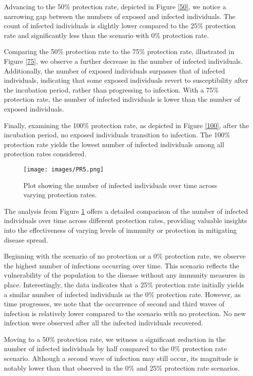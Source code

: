 Advancing to the 50\% protection rate, depicted in Figure \ref{50}, we notice a narrowing gap between the numbers of exposed and infected individuals. The count of infected individuals is slightly lower compared to the 25\% protection rate and significantly less than the scenario with 0\% protection rate.

Comparing the 50\% protection rate to the 75\% protection rate, illustrated in Figure \ref{75}, we observe a further decrease in the number of infected individuals. Additionally, the number of exposed individuals surpasses that of infected individuals, indicating that some exposed individuals revert to susceptibility after the incubation period, rather than progressing to infection. With a 75\% protection rate, the number of infected individuals is lower than the number of exposed individuals.

Finally, examining the 100\% protection rate, as depicted in Figure \ref{100}, after the incubation period, no exposed individuals transition to infection. The 100\% protection rate yields the lowest number of infected individuals among all protection rates considered.

\begin{figure}[H]
	\centering
	\texttt{[image: images/PR5.png]}
	\caption{Plot showing the number of infected individuals over time across varying protection rates. }
	\label{6}
\end{figure}

The analysis from Figure \ref{6} offers a detailed comparison of the number of infected individuals over time across different protection rates, providing valuable insights into the effectiveness of varying levels of immunity or protection in mitigating disease spread.

Beginning with the scenario of no protection or a 0\% protection rate, we observe the highest number of infections occurring over time. This scenario reflects the vulnerability of the population to the disease without any immunity measures in place. Interestingly, the data indicates that a 25\% protection rate initially yields a similar number of infected individuals as the 0\% protection rate. However, as time progresses, we note that the occurrence of second and third waves of infection is relatively lower compared to the scenario with no protection. No new infection were observed after all the infected individuals recovered.

Moving to a 50\% protection rate, we witness a significant reduction in the number of infected individuals by half compared to the 0\% protection rate scenario. Although a second wave of infection may still occur, its magnitude is notably lower than that observed in the 0\% and 25\% protection rate scenarios.

